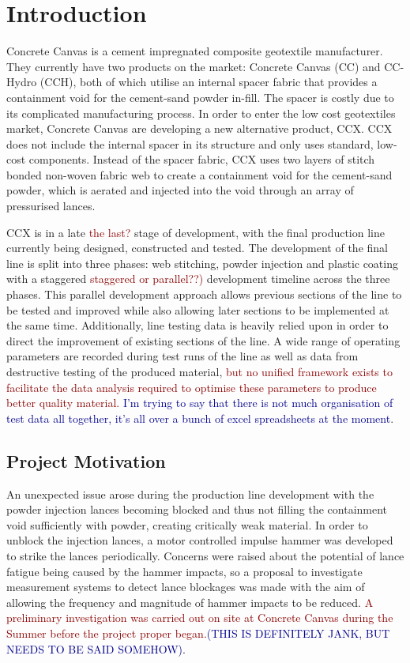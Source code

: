 \documentclass[12pt]{report}
\newcommand{\tcr}[1]{\textcolor{darkRed}{#1}}
\newcommand{\tcb}[1]{\textcolor{darkBlue}{#1}}
\begin{document}
\tableofcontents

\chapter{Introduction}
    
    Concrete Canvas is a cement impregnated composite geotextile manufacturer. They currently have two products on the market: Concrete Canvas (CC) and CC-Hydro (CCH), both of which utilise an internal spacer fabric that provides a containment void for the cement-sand powder in-fill. The spacer is costly due to its complicated manufacturing process. In order to enter the low cost geotextiles market, Concrete Canvas are developing a new alternative product, CCX. CCX does not include the internal spacer in its structure and only uses standard, low-cost components. Instead of the spacer fabric, CCX uses two layers of stitch bonded non-woven fabric web to create a containment void for the cement-sand powder, which is aerated and injected into the void through an array of pressurised lances.
    
    CCX is in a late \tcr{the last?} stage of development, with the final production line currently being designed, constructed and tested. The development of the final line is split into three phases: web stitching, powder injection and plastic coating with a staggered \tcr{staggered or parallel??)} development timeline across the three phases. This parallel development approach allows previous sections of the line to be tested and improved while also allowing later sections to be implemented at the same time. Additionally, line testing data is heavily relied upon in order to direct the improvement of existing sections of the line. A wide range of operating parameters are recorded during test runs of the line as well as data from destructive testing of the produced material, \tcr{but no unified framework exists to facilitate the data analysis required to optimise these parameters to produce better quality material.} \tcb{I'm trying to say that there is not much organisation of test data all together, it's all over a bunch of excel spreadsheets at the moment}. 
    
    \section{Project Motivation}
        An unexpected issue arose during the production line development with the powder injection lances becoming blocked and thus not filling the containment void sufficiently with powder, creating critically weak material. In order to unblock the injection lances, a motor controlled impulse hammer was developed to strike the lances periodically. Concerns were raised about the potential of lance fatigue being caused by the hammer impacts, so a proposal to investigate measurement systems to detect lance blockages was made with the aim of allowing the frequency and magnitude of hammer impacts to be reduced. \tcr{A preliminary investigation was carried out on site at Concrete Canvas during the Summer before the project proper began.}\tcb{(THIS IS DEFINITELY JANK, BUT NEEDS TO BE SAID SOMEHOW)}.
        
\end{document}
